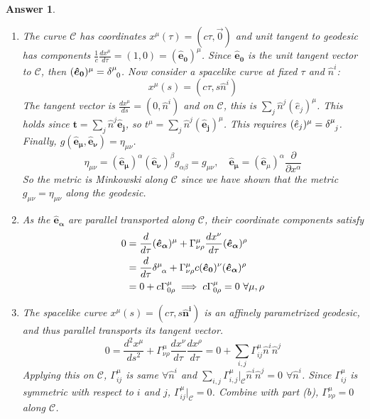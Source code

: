 \documentclass[a4paper]{article}
\theoremstyle{new2}
\newtheorem{ans}{Answer}[section]
\theoremstyle{new}
\begin{document}
\begin{ans}\leavevmode
\begin{enumerate}[label=(\alph*)]
\item The curve $\mathcal{C}$ has coordinates $x^\mu(\tau)=(c\tau,\vec{0})$ and unit tangent to geodesic has components $\frac{1}{c}\frac{dx^\mu}{d\tau}=(1,0)=(\boldsymbol{\hat{e}_0})^\mu$. Since $\boldsymbol{\hat{e}_0}$ is the unit tangent vector to $\mathcal{C}$, then $(\boldsymbol{\hat{e}_0})^\mu=\tensor*{\delta}{*_{}^{\mu}_{0}}$. Now consider a spacelike curve at fixed $\tau$ and $\hat{n}^i$:
$$x^\mu(s)=(c\tau,s\hat{n}^i)$$
The tangent vector is $\frac{dx^\mu}{ds}=(0,\hat{n}^i)$ and on $\mathcal{C}$, this is $\sum_j\hat{n}^j(\hat{e}_j)^\mu$. This holds since $\mathbf{t}=\sum_j\hat{n}^j\boldsymbol{\hat{e}_j}$, so $t^\mu=\sum_j\hat{n}^j(\boldsymbol{\hat{e}_j})^\mu$. This requires $(\hat{e}_j)^\mu=\tensor*{\delta}{*_{}^{\mu}_{j}}$. Finally, $g(\boldsymbol{\hat{e}_\mu},\boldsymbol{\hat{e}_\nu})=\eta_{\mu\nu}$.
$$\eta_{\mu\nu}=(\boldsymbol{\hat{e}_\mu})^\alpha(\boldsymbol{\hat{e}_\nu})^\beta g_{\alpha\beta}=g_{\mu\nu},\quad\boldsymbol{\hat{e}_\mu}=(\boldsymbol{\hat{e}}_\mu)^\alpha\frac{\partial}{\partial x^\alpha}$$
So the metric is Minkowski along $\mathcal{C}$ since we have shown that the metric $g_{\mu\nu}=\eta_{\mu\nu}$ along the geodesic.
\item As the $\boldsymbol{\hat{e}_\alpha}$ are parallel transported along $\mathcal{C}$, their coordinate components satisfy
\begin{align}
    0&=\frac{d}{d\tau}(\boldsymbol{\hat{e}_\alpha})^\mu+\Gamma^\mu_{\nu\rho}\frac{dx^\nu}{d\tau}(\boldsymbol{\hat{e}_\alpha})^\rho\nonumber\\&=\frac{d}{d\tau}\tensor*{\delta}{*_{}^{\mu}_{\alpha}}+\Gamma^\mu_{\nu\rho}c(\boldsymbol{\hat{e}_0})^\nu(\boldsymbol{\hat{e}_\alpha})^\rho\nonumber\\&=0+c\Gamma^\mu_{0\rho}\implies c\Gamma^\mu_{0\rho}=0~\forall\mu,\rho\nonumber
\end{align}
\item The spacelike curve $x^\mu(s)=(c\tau,s\mathbf{\hat{n}^i})$ is an affinely parametrized geodesic, and thus parallel transports its tangent vector.
$$0=\frac{d^2x^\mu}{ds^2}+\Gamma^\mu_{\nu\rho}\frac{dx^\nu}{d\tau}\frac{dx^\rho}{d\tau}=0+\sum_{i,j}\Gamma^\mu_{ij}\hat{n}^i\hat{n}^j$$
Applying this on $\mathcal{C}$, $\Gamma^\mu_{ij}$ is same $\forall\hat{n}^i$ and $\sum_{i,j}\Gamma^\mu_{i,j}|_\mathcal{C}\hat{n}^i\hat{n}^j=0$ $\forall\hat{n}^i$. Since $\Gamma^\mu_{ij}$ is symmetric with respect to $i$ and $j$, $\Gamma_{ij}^\mu|_{\mathcal{C}}=0$. Combine with part (b), $\Gamma^\mu_{\nu\rho}=0$ along $\mathcal{C}$.

\end{enumerate}
\end{ans}
\newpage
\end{document}
